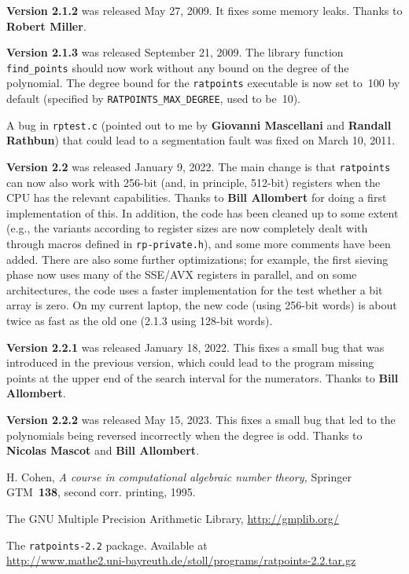 \documentclass[12pt,a4paper,oneside]{amsart}
\newcommand{\rpversion}{2.2} %
\begin{document}
\textbf{Version 2.1.2} was released May 27, 2009. It fixes some memory leaks.
Thanks to \textbf{Robert Miller}.

\textbf{Version 2.1.3} was released September 21, 2009. The library function
\verb+find_points+ should now work without any bound on the degree of the
polynomial. The degree bound for the \texttt{ratpoints} executable is now set
to~100 by default (specified by \verb+RATPOINTS_MAX_DEGREE+, used to be~10).

A bug in \texttt{rptest.c} (pointed out to me by \textbf{Giovanni Mascellani}
and \textbf{Randall Rathbun}) that could lead to a segmentation fault was fixed on
March 10, 2011.

\textbf{Version 2.2} was released January 9, 2022. The main change is that
\texttt{ratpoints} can now also work with 256-bit (and, in principle, 512-bit)
registers when the CPU has the relevant capabilities. Thanks to
\textbf{Bill Allombert} for doing a first implementation of this. In addition,
the code has been cleaned up to some extent (e.g., the variants according
to register sizes are now completely dealt with through macros defined
in \texttt{rp-private.h}), and some more comments have been added.
There are also some further optimizations; for example, the first sieving
phase now uses many of the SSE/AVX registers in parallel, and on some
architectures, the code uses a faster implementation for the test whether
a bit array is zero. On my current laptop, the new code (using 256-bit words)
is about twice as fast as the old one (2.1.3 using 128-bit words).

\textbf{Version 2.2.1} was released January 18, 2022. This fixes a small
bug that was introduced in the previous version, which could lead to
the program missing points at the upper end of the search interval
for the numerators. Thanks to \textbf{Bill Allombert}.

\textbf{Version 2.2.2} was released May 15, 2023. This fixes a small
bug that led to the polynomials being reversed incorrectly when the
degree is odd. Thanks to \textbf{Nicolas Mascot} and \textbf{Bill Allombert}.


\begin{thebibliography}{gmp}
\frenchspacing

  H. Cohen, \textit{A course in computational algebraic number theory,}
  Springer GTM~\textbf{138}, second corr. printing, 1995.

  The GNU Multiple Precision Arithmetic Library, \url{http://gmplib.org/}

  The \texttt{ratpoints-\rpversion} package. Available at \\
  \url{http://www.mathe2.uni-bayreuth.de/stoll/programs/ratpoints-\rpversion.tar.gz}

\end{thebibliography}
\end{document}
